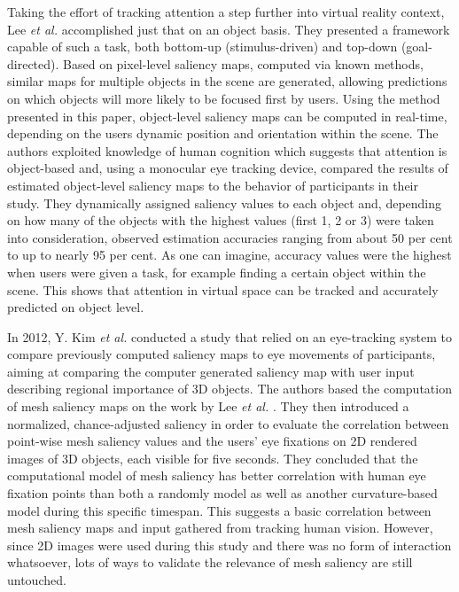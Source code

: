 Taking the effort of tracking attention a step further into virtual reality context, Lee \textit{et al.} \cite{lee2007real} accomplished just that on an object basis. They presented a framework capable of such a task, both bottom-up (stimulus-driven) and top-down (goal-directed). Based on pixel-level saliency maps, computed via known methods, similar maps for multiple objects in the scene are generated, allowing predictions on which objects will more likely to be focused first by users. Using the method presented in this paper, object-level saliency maps can be computed in real-time, depending on the users dynamic position and orientation within the scene. The authors exploited knowledge of human cognition which suggests that attention is object-based \cite{o1999fmri} and, using a monocular eye tracking device, compared the results of estimated object-level saliency maps to the behavior of participants in their study. They dynamically assigned saliency values to each object and, depending on how many of the objects with the highest values (first 1, 2 or 3) were taken into consideration, observed estimation accuracies ranging from about 50 per cent to up to nearly 95 per cent. As one can imagine, accuracy values were the highest when users were given a task, for example finding a certain object within the scene. This shows that attention in virtual space can be tracked and accurately predicted on object level.

In 2012, Y. Kim \textit{et al.} \cite{chen2012schelling} conducted a study that relied on an eye-tracking system to compare previously computed saliency maps to eye movements of participants, aiming at comparing the computer generated saliency map with user input describing regional importance of 3D objects. The authors based the computation of mesh saliency maps on the work by Lee \textit{et al.} \cite{lee2005mesh}. They then introduced a normalized, chance-adjusted saliency in order to evaluate the correlation between point-wise mesh saliency values and the users' eye fixations on 2D rendered images of 3D objects, each visible for five seconds. They concluded that the computational model of mesh saliency has better correlation with human eye fixation points than both a randomly model as well as another curvature-based model during this specific timespan. This suggests a basic correlation between mesh saliency maps and input gathered from tracking human vision. However, since 2D images were used during this study and there was no form of interaction whatsoever, lots of ways to validate the relevance of mesh saliency are still untouched.
